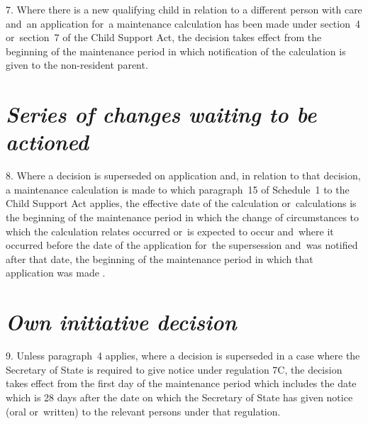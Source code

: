 \documentclass[12pt,a4paper]{article}
\begin{document}
\medskip

7.  Where there is a new qualifying child in relation to a different person with care and~an application for~a maintenance calculation has been made under section~4 or~section~7 of the Child Support Act, the decision takes effect from the beginning of the maintenance period in which notification of the calculation is given to the non-resident parent.

\section*{\itshape\sloppy Series of changes waiting to be actioned}

8.  Where a decision is superseded on application and, in relation to that decision, a maintenance calculation is made to which paragraph~15 of Schedule~1 to the Child Support Act applies, the effective date of the calculation or~calculations is the beginning of the maintenance period in which the change of circumstances to which the calculation relates occurred or~is expected to occur and~where it occurred before the date of the application for~the supersession and~was notified after that date, 
the beginning of the maintenance period in which that application was made%
.%


\section*{\itshape Own initiative decision}

9.  Unless paragraph~4 applies, where a decision is superseded in a case where the 
Secretary of State  %
is required to give notice under regulation 7C, the decision takes effect from the first day of the maintenance period which includes the date which is 28 days after the date on which the 
Secretary of State  %
has given notice (oral or~written) to the relevant persons under that regulation.

\end{document}
